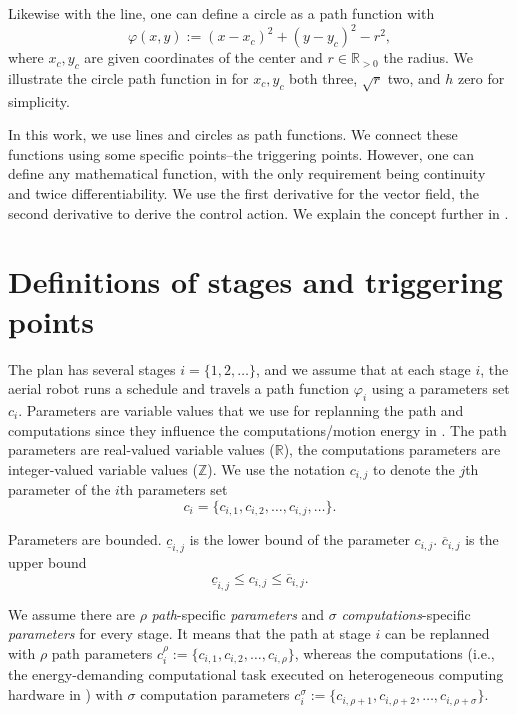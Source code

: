 Likewise with the line, one can define a circle as a path function with
\begin{equation}\label{eq:pathf-circle}
  \varphi(x,y):=(x-x_c)^2+(y-y_c)^2-r^2,
\end{equation}
where $x_c,y_c$ are given coordinates of the center and $r\in\mathbb{R}_{>0}$ the radius. We illustrate the circle path function in  for $x_c,y_c$ both three, $\sqrt{r}$ two, and $h$ zero for simplicity. 

In this work, we use lines and circles as path functions. We connect these functions using some specific points--the triggering points. However, one can define any mathematical function, with the only requirement being continuity and twice differentiability. We use the first derivative for the vector field, the second derivative to derive the control action. We explain the concept further in .


\section{Definitions of stages and triggering points}
\label{sec:defs-stages-triggs}

The plan has several stages $i=\{1,2,\dots\}$, and we assume that at each stage $i$, the aerial robot runs a schedule and travels a path function $\varphi_i$ using a parameters set $c_i$.
Parameters are variable values that we use for replanning the path and computations since they influence the computations/motion energy in . The path parameters are real-valued variable values ($\mathbb{R}$), the computations parameters are integer-valued variable values ($\mathbb{Z}$). We use the notation  $c_{i,j}$ to denote the $j$th parameter of the $i$th parameters set
\begin{equation}
  c_i=\{c_{i,1},c_{i,2},\dots,c_{i,j},\dots\}.
\end{equation}

Parameters are bounded. $\underline{c}_{i,j}$ is the lower bound of the parameter $c_{i,j}$. $\overline{c}_{i,j}$ is the upper bound
\begin{equation}
  \underline{c}_{i,j}\leq c_{i,j}\leq\overline{c}_{i,j}.
\end{equation}

We assume there are $\rho$ \emph{path}-specific \emph{parameters} and $\sigma$ \emph{computations}-specific \emph{parameters} for every stage. It means that the path at stage $i$ can be replanned with $\rho$ path parameters
$c_i^\rho:=\{c_{i,1},c_{i,2},\dots,c_{i,\rho}\}$,
whereas the computations (i.e., the energy-demanding computational task executed on heterogeneous computing hardware in ) with $\sigma$ computation parameters 
$c_i^\sigma:=\{c_{i,\rho+1},c_{i,\rho+2},\dots,c_{i,\rho+\sigma}\}$.

